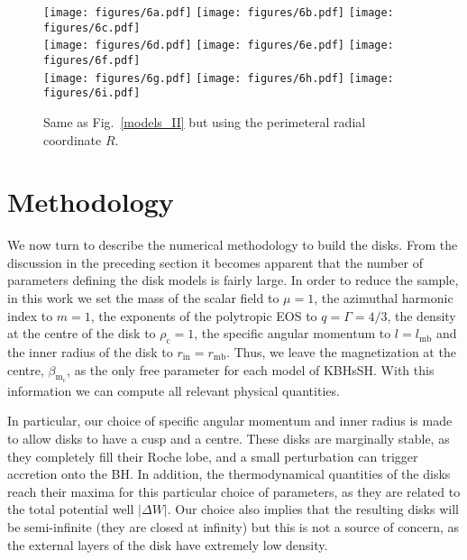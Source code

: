 \documentclass[twocolumn,aps,showpacs,showkeys,prd,superscriptaddress,byrevtex, amsmath]{revtex4-1}
\begin{document}
\begin{figure*}
\centering
\texttt{[image: figures/6a.pdf]}
\hspace{-0.3cm}
\texttt{[image: figures/6b.pdf]}
\hspace{-0.2cm}
\texttt{[image: figures/6c.pdf]}
\\
\texttt{[image: figures/6d.pdf]}
\hspace{-0.3cm}
\texttt{[image: figures/6e.pdf]}
\hspace{-0.2cm}
\texttt{[image: figures/6f.pdf]}
\\
\texttt{[image: figures/6g.pdf]}
\hspace{-0.3cm}
\texttt{[image: figures/6h.pdf]}
\hspace{-0.2cm}
\texttt{[image: figures/6i.pdf]}
\hspace{-0.2cm}
\caption{Same as Fig.~\ref{models_II} but using the perimeteral radial coordinate $R$.}
\label{models_peri_II}
\end{figure*}

\section{Methodology}
\label{procedure}

We now turn to describe the numerical methodology to build the disks. From the discussion in the preceding section it becomes apparent that the number of parameters defining the disk models is fairly large. In order to reduce the sample, in this work we set the mass of the scalar field to $\mu = 1$, the  azimuthal harmonic index to $m = 1$, the exponents of the polytropic EOS to $q = \Gamma = 4/3$, the density at the centre of the disk to $\rho_{\mathrm{c}} = 1$, the specific angular momentum to $l = l_{\mathrm{mb}}$ and the inner radius of the disk to $r_{\mathrm{in}} = r_{\mathrm{mb}}$. Thus, we leave the magnetization at the centre, $\beta_{\mathrm{m_c}}$, as the only free parameter for each model of KBHsSH. With this information we can compute all relevant physical quantities.

In particular, our choice of specific angular momentum and inner radius is made to allow disks to have a cusp and a centre. These disks are marginally stable, as they completely fill their Roche lobe, and a small perturbation can trigger accretion onto the BH. In addition, the thermodynamical quantities of the disks reach their maxima for this particular choice of parameters, as they are related to the total potential well $|\Delta W|$. Our choice also implies that the resulting disks will be semi-infinite (they are closed at infinity) but this is not a source of concern, as the external layers of the disk have extremely low density.
\end{document}
